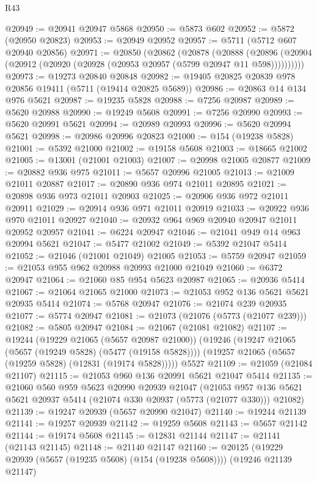 \begin{lexlean}{R43}
\begin{coremodule}
@20949 := @20941 @20947 @5868
@20950 := @5873 @602
@20952 := @5872 (@20950 @20823)
@20953 := @20949 @20952
@20957 := @5711 (@5712 @607 @20940 @20856)
@20971 := @20850
    (@20862
      (@20878
        (@20888
          (@20896 (@20904 (@20912 (@20920 (@20928 (@20953 @20957 (@5799 @20947 @11 @598))))))))))
@20973 := @19273 @20840 @20848
@20982 := @19405 @20825 @20839 @978 @20856 @19411 (@5711 (@19414 @20825 @5689))
@20986 := @20863 @14 @134 @976 @5621
@20987 := @19235 @5828
@20988 := @7256 @20987
@20989 := @5620 @20988
@20990 := @19249 @5608
@20991 := @7256 @20990
@20993 := @5620 @20991 @5621
@20994 := @20989 @20993
@20996 := @5620 @20994 @5621
@20998 := @20986 @20996 @20823
@21000 := @154 (@19238 @5828)
@21001 := @5392 @21000
@21002 := @19158 @5608
@21003 := @18665 @21002
@21005 := @13001 (@21001 @21003)
@21007 := @20998 @21005 @20877
@21009 := @20882 @936 @975
@21011 := @5657 @20996 @21005
@21013 := @21009 @21011 @20887
@21017 := @20890 @936 @974 @21011 @20895
@21021 := @20898 @936 @973 @21011 @20903
@21025 := @20906 @936 @972 @21011 @20911
@21029 := @20914 @936 @971 @21011 @20919
@21033 := @20922 @936 @970 @21011 @20927
@21040 := @20932 @964 @969 @20940 @20947 @21011 @20952 @20957
@21041 := @6224 @20947
@21046 := @21041 @949 @14 @963 @20994 @5621
@21047 := @5477 @21002
@21049 := @5392 @21047 @5414
@21052 := @21046 (@21001 @21049) @21005
@21053 := @5759 @20947
@21059 := @21053 @955 @962 @20988 @20993 @21000 @21049
@21060 := @6372 @20947
@21064 := @21060 @85 @954 @5623 @20987
@21065 := @20936 @5414
@21067 := @21064 @21065 @21000
@21073 := @21053 @952 @136 @5621 @5621 @20935 @5414
@21074 := @5768 @20947
@21076 := @21074 @239 @20935
@21077 := @5774 @20947
@21081 := @21073 (@21076 (@5773 (@21077 @239)))
@21082 := @5805 @20947
@21084 := @21067 (@21081 @21082)
@21107 := @19244
    (@19229 @21065 (@5657 @20987 @21000))
    (@19246
      (@19247 @21065 (@5657 (@19249 @5828) (@5477 (@19158 @5828))))
      (@19257 @21065 (@5657 (@19259 @5828) (@12831 (@19174 @5828)))))
    @5527
@21109 := @21059 (@21084 @21107)
@21115 := @21053 @960 @136 @20991 @5621 @21047 @5414
@21135 := @21060
    @560
    @959
    @5623
    @20990
    @20939
    @21047
    (@21053 @957 @136 @5621 @5621 @20937 @5414 (@21074 @330 @20937 (@5773 (@21077 @330))) @21082)
@21139 := @19247 @20939 (@5657 @20990 @21047)
@21140 := @19244 @21139
@21141 := @19257 @20939
@21142 := @19259 @5608
@21143 := @5657 @21142
@21144 := @19174 @5608
@21145 := @12831 @21144
@21147 := @21141 (@21143 @21145)
@21148 := @21140 @21147
@21160 := @20125
    (@19229 @20939 (@5657 (@19235 @5608) (@154 (@19238 @5608))))
    (@19246 @21139 @21147)

\end{coremodule}
\end{lexlean}
